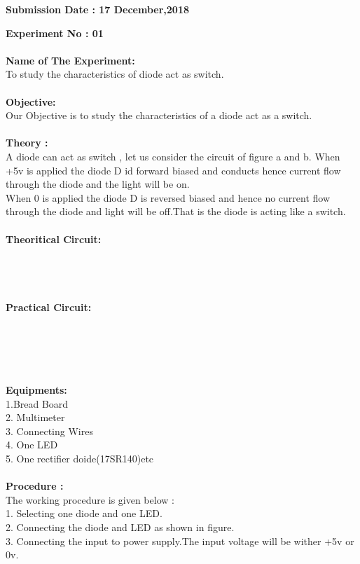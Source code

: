 \documentclass[a4paper,10pt]{article}
\begin{document}
	
	\begin{center}
		\textbf{{Submission Date : 17 December,2018}} \\
		
	\end{center}
	\vspace{45mm}
	\textbf{{\large Experiment No : 01}}\\ \\
	\textbf{{\large Name of The Experiment:}}\\
	 To study the characteristics of diode act as switch.\\ \\
	\textbf{{\large Objective:}}\\ Our Objective is to study the characteristics of a diode act as a switch.\\ \\
	\textbf{{\large Theory :}}\\ A diode can act as switch , let us consider the circuit of figure a and b. When +5v is applied the diode D id forward biased and conducts hence current flow through the diode and the light will be on.\\
	When 0 is applied the diode D is reversed biased and hence no current flow through the diode and light will be off.That is the diode is acting like a switch. \\
	\hspace{-2mm}\\
	\textbf{{\large Theoritical Circuit:}}\\ \\ \\ \\ \\
	\textbf{{\large Practical Circuit:}}\\ \\ \\ \\ \\ \\
	\textbf{{\large Equipments:}}\\ 1.Bread Board\\ 2. Multimeter\\ 3. Connecting Wires\\4. One LED\\5. One rectifier doide(17SR140)etc\\ \\
	\textbf{{\large Procedure :}}\\ The working procedure is given below :\\1. Selecting one diode and one LED.\\2. Connecting the diode and LED as shown in figure.\\3. Connecting the input to power supply.The input voltage will be wither +5v or 0v.\\ \\
	
\end{document}
